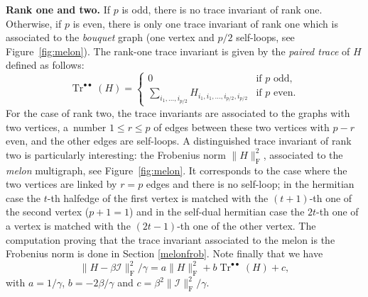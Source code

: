 \documentclass[pdftex]{sigma}
\numberwithin{equation}{section}
\theoremstyle{definition}
\begin{document}
{\bf Rank one and two.}
If $p$ is odd, there is no trace invariant of rank one. Otherwise, if $p$ is even, there is only one trace invariant of rank one which is associated to the {\em bouquet} graph (one vertex and $p/2$ self-loops, see Figure~\ref{fig:melon}). The rank-one trace invariant is given by the {\em paired trace} of $H$ defined as follows:
\[ \operatorname{Tr}^{\bullet \bullet}(H) =
    \begin{cases}
        0 & \mbox{if } p \mbox{ odd,} \\
      \displaystyle  \sum_{i_1,\dots, i_{p/2}} H_{i_1,i_1,\dots,i_{p/2},i_{p/2}} & \text{if } p \mbox{ even.}
    \end{cases}
\]
For the case of rank two, the trace invariants are associated to the graphs with two vertices, a~number $1\leq r \leq p$ of edges between these two vertices with $p-r$ even, and the other edges are self-loops. A distinguished trace invariant of rank two is particularly interesting: the Frobenius norm $\| H \|_{\mathrm{F}}^2$, associated to the {\em melon} multigraph, see Figure~\ref{fig:melon}. It corresponds to the case where the two vertices are linked by $r=p$ edges and there is no self-loop; in the hermitian case the $t$-th halfedge of the first vertex is matched with the $(t+1)$-th one of the second vertex ($p+1=1$) and in the self-dual hermitian case the $2t$-th one of a vertex is matched with the $(2t-1)$-th one of the other vertex. The computation proving that the trace invariant associated to the melon is the Frobenius norm is done in Section \ref{melonfrob}. Note finally that we have
\[\| H -\beta \mathcal{I} \| _{\mathrm{F}}^2 / \gamma = a\| H \| _{\mathrm{F}}^2 +b \operatorname{Tr}^{\bullet \bullet}(H) + c ,\]
with $a=1/ \gamma$, $b= - 2 \beta / \gamma$ and $c= \beta^2 \|\mathcal{I} \| _{\mathrm{F}}^2 / \gamma$.
\end{document}
